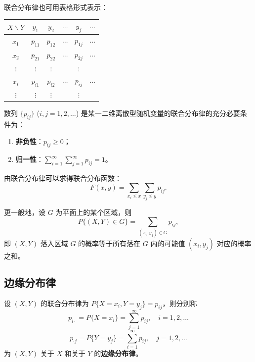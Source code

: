 ﻿\documentclass[lang=cn,11pt]{elegantbook}
\begin{document}
联合分布律也可用表格形式表示：

\begin{center}
\begin{tabular}{c|cccc|c}
\toprule
$X \backslash Y$ & $y_1$ & $y_2$ & $\cdots$ & $y_j$ & $\cdots$ \\
\midrule
$x_1$ & $p_{11}$ & $p_{12}$ & $\cdots$ & $p_{1j}$ & $\cdots$ \\
$x_2$ & $p_{21}$ & $p_{22}$ & $\cdots$ & $p_{2j}$ & $\cdots$ \\
$\vdots$ & $\vdots$ & $\vdots$ & & $\vdots$ & \\
$x_i$ & $p_{i1}$ & $p_{i2}$ & $\cdots$ & $p_{ij}$ & $\cdots$ \\
$\vdots$ & $\vdots$ & $\vdots$ & & $\vdots$ & \\
\bottomrule
\end{tabular}
\end{center}

\begin{property}\label{prop:joint-pm-condition}
数列 $\{p_{ij}\}$ ($i,j = 1,2,\dots$) 是某一二维离散型随机变量的联合分布律的充分必要条件为：
\begin{enumerate}
    \item \textbf{非负性}：$p_{ij} \geqslant 0$；
    \item \textbf{归一性}：$\displaystyle\sum_{i=1}^{\infty}\sum_{j=1}^{\infty}p_{ij} = 1$。
\end{enumerate}
\end{property}

由联合分布律可以求得联合分布函数：
\[
F(x,y) = \sum_{x_i \leqslant x}\sum_{y_j \leqslant y}p_{ij}.
\]

更一般地，设 $G$ 为平面上的某个区域，则
\[
P\{(X,Y) \in G\} = \sum_{(x_i,y_j) \in G}p_{ij},
\]
即 $(X,Y)$ 落入区域 $G$ 的概率等于所有落在 $G$ 内的可能值 $(x_i, y_j)$ 对应的概率之和。

\subsection{边缘分布律}

\begin{definition}[边缘分布律] \label{def:marginal-pm}
设 $(X,Y)$ 的联合分布律为 $P\{X = x_i, Y = y_j\} = p_{ij}$，则分别称
\[
p_{i\cdot} = P\{X = x_i\} = \sum_{j=1}^{\infty}p_{ij}, \quad i = 1,2,\dots
\]
\[
p_{\cdot j} = P\{Y = y_j\} = \sum_{i=1}^{\infty}p_{ij}, \quad j = 1,2,\dots
\]
为 $(X,Y)$ 关于 $X$ 和关于 $Y$ 的\textbf{边缘分布律}。
\end{definition}
\end{document}
